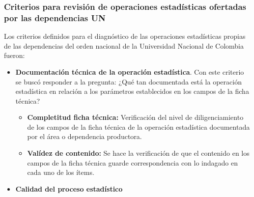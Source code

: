 \documentclass[
]{book}
\begin{document}
\hypertarget{criterios-para-revisiuxf3n-de-operaciones-estaduxedsticas-ofertadas-por-las-dependencias-un}{%
\subsubsection{Criterios para revisión de operaciones estadísticas ofertadas por las dependencias UN}\label{criterios-para-revisiuxf3n-de-operaciones-estaduxedsticas-ofertadas-por-las-dependencias-un}}

Los criterios definidos para el diagnóstico de las operaciones estadísticas propias de las dependencias
del orden nacional de la Universidad Nacional de Colombia fueron:

\begin{itemize}
\item
  \textbf{Documentación técnica de la operación estadística}. Con este criterio se buscó responder a la pregunta: ¿Qué tan documentada está la operación estadística en relación a los parámetros
  establecidos en los campos de la ficha técnica?

  \begin{itemize}
  \item
    \textbf{Completitud ficha técnica:} Verificación del nivel de diligenciamiento de los campos de la ficha
    técnica de la operación estadística documentada por
    el área o dependencia productora.
  \item
    \textbf{Valídez de contenido:} Se hace la verificación de que el contenido en los campos de la ficha
    técnica guarde correspondencia con lo indagado en
    cada uno de los ítems.
  \end{itemize}
\item
  \textbf{Calidad del proceso estadístico}


\end{itemize}
\end{document}
